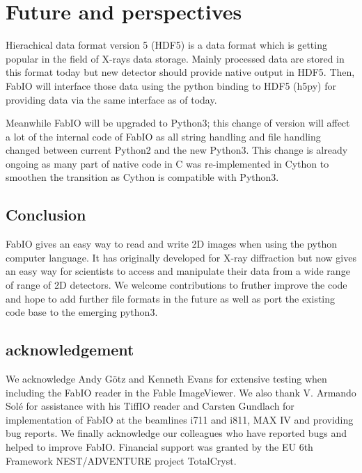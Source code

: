\documentclass{iucr}
\begin{document}
\section{Future and perspectives}

Hierachical data format version 5 (HDF5\cite{hdf5}) is a data format which is
getting popular in the field of X-rays data storage. Mainly processed
data are stored in this format today but new detector should provide native
output in HDF5. Then, FabIO will interface those data using the python binding 
to HDF5 (h5py\cite{h5py}) for providing data via the same interface as of today.

Meanwhile FabIO will be upgraded to Python3; this change of version will affect
a lot of the internal code of FabIO as all string handling and file handling
changed between current Python2 and the new Python3. This change is already
ongoing as many part of native code in C was re-implemented in
Cython\cite{cython} to smoothen the transition as Cython is compatible with
Python3.

\subsection{Conclusion}

FabIO gives an easy way to read and write 2D images when using the
python computer language.
It has originally developed for X-ray diffraction but now gives
an easy way for scientists to access and manipulate
their data from a wide range of range of 2D detectors.
We welcome contributions to fruther improve the code and hope to add
further file formats in the future as well as port the existing code base to the emerging python3.


\subsection{acknowledgement}
We acknowledge Andy G\"otz and Kenneth Evans for extensive testing when including
the FabIO reader in the Fable ImageViewer.
We also thank V. Armando Sol\'e for assistance with his TiffIO reader and
Carsten Gundlach for implementation of FabIO at the beamlines i711 and i811, MAX IV and providing bug reports.
We finally acknowledge our colleagues who have reported bugs and helped to
improve FabIO.
Financial support was granted by the EU 6th Framework NEST/ADVENTURE project
TotalCryst.





\appendix
\end{document}
